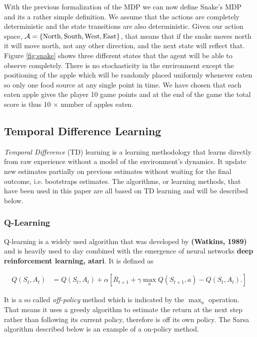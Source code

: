\documentclass[result.tex]{subfiles}
\begin{document}
    With the previous formalization of the MDP we can now define Snake's MDP and its a rather simple definition. We assume that the actions are completely deterministic and the state transitions are also deterministic. Given our action space, $\mathcal{A} = \{ \text{North}, \text{South}, \text{West}, \text{East} \}$, that means that if the snake moves north it will move north, not any other direction, and the next state will reflect that. Figure \ref{fig:snake} shows three different states that the agent will be able to observe completely. There is no stochasticity in the environment except the positioning of the apple which will be randomly placed uniformly whenever eaten so only one food source at any single point in time. We have chosen that each eaten apple gives the player 10 game points and at the end of the game the total score is thus 10 $\times$ number of apples eaten.

    \subsection*{Temporal Difference Learning}

    \textit{Temporal Difference} (TD) learning is a learning methodology that learns directly from raw experience without a model of the environment's dynamics. It update new estimates partially on previous estimates without waiting for the final outcome, i.e. bootstraps estimates. The algorithms, or learning methods, that have been used in this paper are all based on TD learning and will be described below.

    \subsubsection*{Q-Learning}

    Q-learning is a widely used algorithm that was developed by \textbf{(Watkins, 1989)} and is heavily used to day combined with the emergence of neural networks \textbf{deep reinforcement learning, atari}. It is defined as

    \begin{align*}
        Q(S_t, A_t) &=
        Q(S_t , A_t) +
        \alpha \left[
        R_{t + 1} +
        \gamma \max_a Q(S_{t + 1}, a) - Q(S_t, A_t).
        \right]
    \end{align*}

    It is a so called \textit{off-policy} method which is indicated by the $\max_a$ operation. That means it uses a greedy algorithm to estimate the return at the next step rather than following its current policy, therefore is off its own policy. The Sarsa algorithm described below is an example of a on-policy method.
\end{document}

